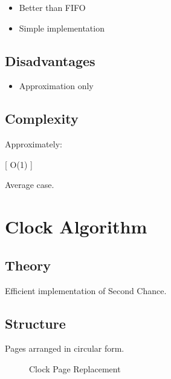 \begin{itemize}
\item Better than FIFO
\item Simple implementation
\end{itemize}

\subsection{Disadvantages}

\begin{itemize}
\item Approximation only
\end{itemize}

\subsection{Complexity}

Approximately:

[
O(1)
]

Average case.

\section{Clock Algorithm}

\subsection{Theory}

Efficient implementation of Second Chance.

\subsection{Structure}

Pages arranged in circular form.

\begin{figure}[h]
\centering
{}
\caption{Clock Page Replacement}
\end{figure}

